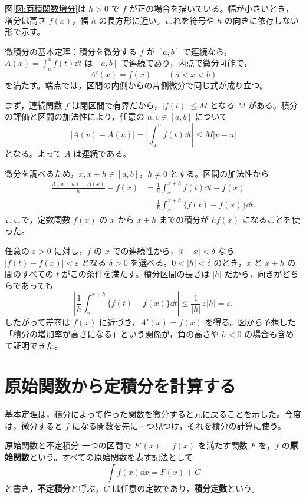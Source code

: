 図\ref{図:面積関数増分}は $h>0$ で $f$ が正の場合を描いている。幅が小さいとき，増分は高さ $f(x)$，幅 $h$ の長方形に近い。これを符号や $h$ の向きに依存しない形で示す。

\begin{theorem}{微積分の基本定理：積分を微分する}\label{定理:基本定理第一}
$f$ が $[a,b]$ で連続なら，$A(x)=\int_a^x f(t)\dd t$ は $[a,b]$ で連続であり，内点で微分可能で，
\[
 A'(x)=f(x)\qquad(a<x<b)
\]
を満たす。端点では，区間の内側からの片側微分で同じ式が成り立つ。
\end{theorem}

まず，連続関数 $f$ は閉区間で有界だから，$|f(t)|\le M$ となる $M$ がある。積分の評価と区間の加法性により，任意の $u,v\in[a,b]$ について
\[
 |A(v)-A(u)|=\left|\int_u^v f(t)\dd t\right|
 \le M|v-u|
\]
となる。よって $A$ は連続である。

微分を調べるため，$x,x+h\in[a,b]$，$h\ne0$ とする。区間の加法性から
\begin{align*}
 \frac{A(x+h)-A(x)}h-f(x)
 &=\frac1h\int_x^{x+h}f(t)\dd t-f(x)\\
 &=\frac1h\int_x^{x+h}\{f(t)-f(x)\}\dd t.
\end{align*}
ここで，定数関数 $f(x)$ の $x$ から $x+h$ までの積分が $hf(x)$ になることを使った。

任意の $\varepsilon>0$ に対し，$f$ の $x$ での連続性から，$|t-x|<\delta$ なら $|f(t)-f(x)|<\varepsilon$ となる $\delta>0$ を選べる。$0<|h|<\delta$ のとき，$x$ と $x+h$ の間のすべての $t$ がこの条件を満たす。積分区間の長さは $|h|$ だから，向きがどちらであっても
\[
 \left|\frac1h\int_x^{x+h}\{f(t)-f(x)\}\dd t\right|
 \le\frac1{|h|}\,\varepsilon|h|=\varepsilon.
\]
したがって差商は $f(x)$ に近づき，$A'(x)=f(x)$ を得る。図から予想した「積分の増加率が高さになる」という関係が，負の高さや $h<0$ の場合も含めて証明できた。

\section{原始関数から定積分を計算する}\label{節:原始関数基本定理}
基本定理は，積分によって作った関数を微分すると元に戻ることを示した。今度は，微分すると $f$ になる関数を先に一つ見つけ，それを積分の計算に使う。

\begin{definition}{原始関数と不定積分}
一つの区間で $F'(x)=f(x)$ を満たす関数 $F$ を，$f$ の\textbf{原始関数}という。すべての原始関数を表す記法として
\[
 \int f(x)\dd x=F(x)+C
\]
と書き，\textbf{不定積分}と呼ぶ。$C$ は任意の定数であり，\textbf{積分定数}という。
\end{definition}

